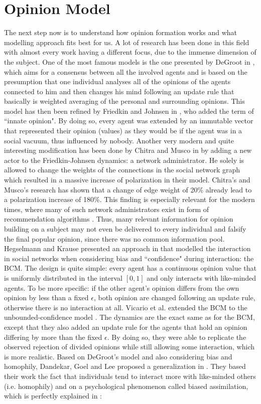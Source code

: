 \documentclass[12pt,a4paper,twoside]{article}
\begin{document}
\section{Opinion Model}\label{sec:opinion_model}
The next step now is to understand how opinion formation works and what modelling approach fits best for us. A lot of research has been done in this field with almost every work having a different focus, due to the immense dimension of the subject. One of the most famous models is the one presented by DeGroot in \cite{Degroot1974}, which aims for a consensus between all the involved agents and is based on the presumption that one individual analyses all of the opinions of the agents connected to him and then changes his mind following an update rule that basically is weighted averaging of the personal and surrounding opinions. This model has then been refined by Friedkin and Johnsen in \cite{Friedkin1990}, who added the term of ``innate opinion". By doing so, every agent was extended by an immutable vector that represented their opinion (values) as they would be if the agent was in a social vacuum, thus influenced by nobody. Another very modern and quite interesting modification has been done by Chitra and Musco in \cite{Chitra2019} by adding a new actor to the Friedkin-Johnsen dynamics: a network administrator. He solely is allowed to change the weights of the connections in the social network graph which resulted in a massive increase of polarization in their model. Chitra's and Musco's research has shown that a change of edge weight of 20\% already lead to a polarization increase of 180\%. This finding is especially relevant for the modern times, where many of such network administrators exist in form of recommendation algorithms \cite{Pariser2011}. Thus, many relevant information for opinion building on a subject may not even be delivered to every individual and falsify the final popular opinion, since there was no common information pool. Hegselmann and Krause presented an approach in \cite{Hegselmann2002} that modelled the interaction in social networks when considering bias and ``confidence" during interaction: the \ac{BCM}. The design is quite simple: every agent has a continuous opinion value that is uniformly distributed in the interval $\left[0, 1\right]$ and only interacts with like-minded agents. To be more specific: if the other agent's opinion differs from the own opinion by less than a fixed $\epsilon$, both opinion are changed following an update rule, otherwise there is no interaction at all. Vicario et al. extended the \ac{BCM} to the unbounded-confidence model \cite{Vicario2016}. The dynamics are the exact same as for the \ac{BCM}, except that they also added an update rule for the agents that hold an opinion differing by more than the fixed $\epsilon$. By doing so, they were able to replicate the observed rejection of divided opinions while still allowing some interaction, which is more realistic. Based on DeGroot's model and also considering bias and homophily, Dandekar, Goel and Lee proposed a generalization in \cite{Dandekar2013}. They based their work the fact that individuals tend to interact more with like-minded others (i.e. homophily) and on a psychological phenomenon called biased assimilation, which is perfectly explained in \cite{Lord2009}: 
\end{document}
